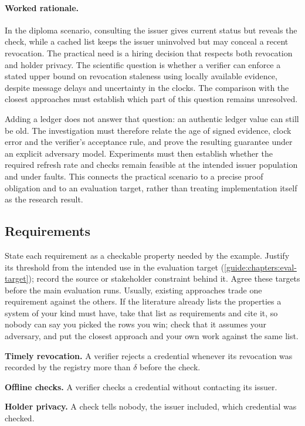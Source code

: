 \paragraph{Worked rationale.} In the diploma scenario, consulting the issuer gives current status but reveals the check, while a cached list keeps the issuer uninvolved but may conceal a recent revocation. The practical need is a hiring decision that respects both revocation and holder privacy. The scientific question is whether a verifier can enforce a stated upper bound on revocation staleness using locally available evidence, despite message delays and uncertainty in the clocks. The comparison with the closest approaches must establish which part of this question remains unresolved.

Adding a ledger does not answer that question: an authentic ledger value can still be old. The investigation must therefore relate the age of signed evidence, clock error and the verifier's acceptance rule, and prove the resulting guarantee under an explicit adversary model. Experiments must then establish whether the required refresh rate and checks remain feasible at the intended issuer population and under faults. This connects the practical scenario to a precise proof obligation and to an evaluation target, rather than treating implementation itself as the research result.

\subsection[Requirements]{Requirements\skimmark}\label{guide:chapters:requirements}
State each requirement as a checkable property needed by the example. Justify its threshold from the intended use in the evaluation target (\cref{guide:chapters:eval-target}); record the source or stakeholder constraint behind it. Agree these targets before the main evaluation runs. Usually, existing approaches trade one requirement against the others. If the literature already lists the properties a system of your kind must have, take that list as requirements and cite it, so nobody can say you picked the rows you win; check that it assumes your adversary, and put the closest approach and your own work against the same list.
\begin{requirements}
  \item\label{guide:req:timely} \textbf{Timely revocation.} A verifier rejects a credential whenever its revocation was recorded by the registry more than $\delta$ before the check.
  \item\label{guide:req:offline} \textbf{Offline checks.} A verifier checks a credential without contacting its issuer.
  \item\label{guide:req:private} \textbf{Holder privacy.} A check tells nobody, the issuer included, which credential was checked.
\end{requirements}

